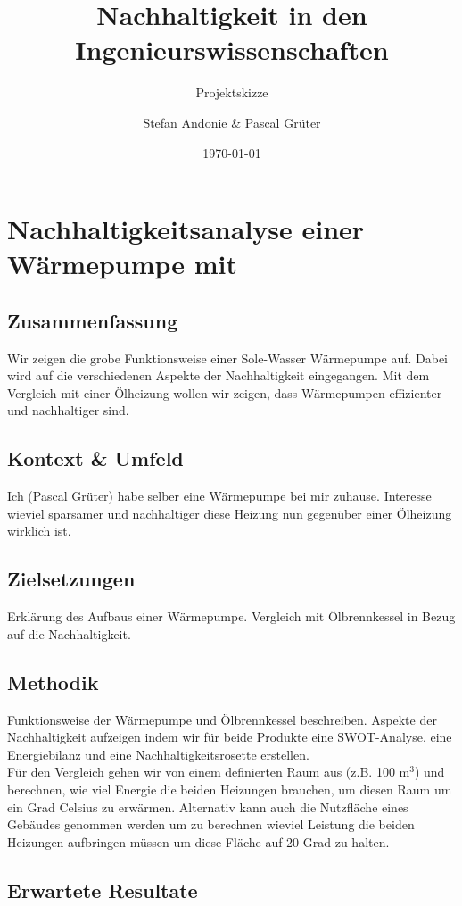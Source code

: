\documentclass[09pt,paper=a4,final]{scrartcl}
\title{Nachhaltigkeit in den Ingenieurswissenschaften}
\subtitle{Projektskizze}
\author{Stefan Andonie \& Pascal Grüter}
\date{\today{}}
\begin{document}
\section*{Nachhaltigkeitsanalyse einer Wärmepumpe mit}

\subsection*{Zusammenfassung}

Wir zeigen die grobe Funktionsweise einer Sole-Wasser Wärmepumpe auf. Dabei wird auf die verschiedenen Aspekte der Nachhaltigkeit eingegangen. Mit dem Vergleich mit einer Ölheizung wollen wir zeigen, dass Wärmepumpen effizienter und nachhaltiger sind.

\subsection*{Kontext \& Umfeld}

Ich (Pascal Grüter) habe selber eine Wärmepumpe bei mir zuhause. Interesse wieviel sparsamer und nachhaltiger diese Heizung nun gegenüber einer Ölheizung wirklich ist.

\subsection*{Zielsetzungen}

Erklärung des Aufbaus einer Wärmepumpe.
Vergleich mit Ölbrennkessel in Bezug auf die Nachhaltigkeit.

\subsection*{Methodik}

Funktionsweise der Wärmepumpe und Ölbrennkessel beschreiben. Aspekte der Nachhaltigkeit aufzeigen indem wir für beide Produkte eine SWOT-Analyse, eine Energiebilanz und eine Nachhaltigkeitsrosette erstellen. \\
Für den Vergleich gehen wir von einem definierten Raum aus (z.B. 100 m$^{3}$) und berechnen, wie viel Energie die beiden Heizungen brauchen, um diesen Raum um ein Grad Celsius zu erwärmen. Alternativ kann auch die Nutzfläche eines Gebäudes genommen werden um zu berechnen wieviel Leistung die beiden Heizungen aufbringen müssen um diese Fläche auf 20 Grad zu halten.



\subsection*{Erwartete Resultate}
\end{document}
